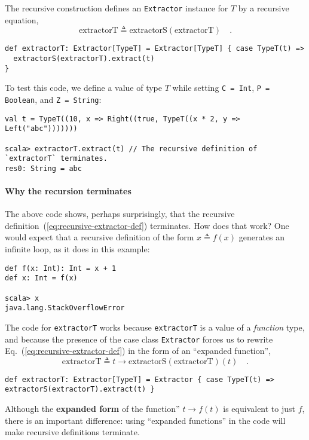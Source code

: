 The recursive construction defines an \lstinline!Extractor! instance
for $T$ by a recursive equation,
\begin{equation}
\text{extractorT}\triangleq\text{extractorS}\left(\text{extractorT}\right)\quad.\label{eq:recursive-extractor-def}
\end{equation}
\begin{lstlisting}
def extractorT: Extractor[TypeT] = Extractor[TypeT] { case TypeT(t) =>
  extractorS(extractorT).extract(t)
}
\end{lstlisting}
To test this code, we define a value of type $T$ while setting \lstinline!C = Int!,
\lstinline!P = Boolean!, and \lstinline!Z = String!:
\begin{lstlisting}
val t = TypeT((10, x => Right((true, TypeT((x * 2, y => Left("abc")))))))

scala> extractorT.extract(t) // The recursive definition of `extractorT` terminates.
res0: String = abc
\end{lstlisting}


\paragraph{Why the recursion terminates}

The above code shows, perhaps surprisingly, that the recursive definition~(\ref{eq:recursive-extractor-def})
terminates. How does that work? One would expect that a recursive
definition of the form $x\triangleq f(x)$ generates an infinite loop,
as it does in this example:
\begin{lstlisting}
def f(x: Int): Int = x + 1
def x: Int = f(x)

scala> x
java.lang.StackOverflowError
\end{lstlisting}
The code for \lstinline!extractorT! works because \lstinline!extractorT!
is a value of a \emph{function} type, and because the presence of
the case class \lstinline!Extractor! forces us to rewrite Eq.~(\ref{eq:recursive-extractor-def})
in the form of an ``expanded function'', 
\[
\text{extractorT}\triangleq t\rightarrow\text{extractorS}\left(\text{extractorT}\right)(t)\quad.
\]
\begin{lstlisting}
def extractorT: Extractor[TypeT] = Extractor { case TypeT(t) => extractorS(extractorT).extract(t) }
\end{lstlisting}
Although the \textbf{expanded form} of the function''
$t\rightarrow f(t)$ is equivalent to just $f$, there is an important
difference: using ``expanded functions'' in the code will make recursive
definitions  terminate.

